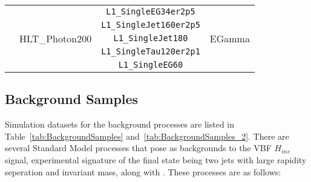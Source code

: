 \begin{table}[h]
\begin{tabular}{l l c c}
                               & \multirow{5}{*}{HLT\_Photon200}                           & \texttt{L1\_SingleEG34er2p5}    & \multirow{5}{*}{EGamma}       \\
                               &                                                           & \texttt{L1\_SingleJet160er2p5}  &                               \\
                               &                                                           & \texttt{L1\_SingleJet180}       &                               \\
                               &                                                           & \texttt{L1\_SingleTau120er2p1}  &                               \\
                               &                                                           & \texttt{L1\_SingleEG60}         &                               \\\hline

        \hline\hline %
    \end{tabular}

    \label{tab:triggers}
\end{table}

\subsection{Background Samples}


Simulation datasets for the background processes are listed in
Table~\ref{tab:BackgroundSamples} and~\ref{tab:BackgroundSamples_2}. 
There are several Standard Model processes that pose as backgrounds to the VBF $H_{inv}$ signal, experimental signature of the 
final state being two jets with large rapidity seperation and invariant mass, along with \ptmiss.  
These processes are as follows:

